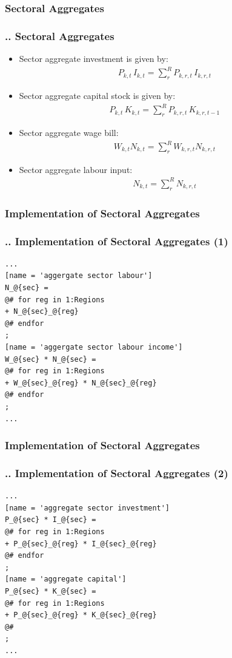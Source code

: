 \documentclass[11pt,aspectratio=169]{beamer}
\begin{document}
\subsubsection{Sectoral Aggregates}
\begin{frame}
\frametitle{{\thesection.\thesubsection.\thesubsubsection} Sectoral Aggregates}
\scriptsize
\begin{itemize}
\item Sector aggregate investment is given by:
\begin{align*}
P_{k,t} \, I_{k,t} = \sum_{r}^{R} P_{k,r,t} \, I_{k,r,t}
\end{align*}
\item Sector aggregate capital stock is given by:
\begin{align*}
P_{k,t} \, K_{k,t} = \sum_{r}^{R} P_{k,r,t} \, K_{k,r,t-1}
\end{align*}
\item Sector aggregate wage bill:
\begin{align*}
W_{k,t} N_{k,t} = \sum_{r}^{R}  W_{k,r,t} N_{k,r,t}
\end{align*}
\item Sector aggregate labour input:
\begin{align*}
N_{k,t} = \sum_{r}^{R} N_{k,r,t}
\end{align*}
\end{itemize}
\end{frame}

\subsubsection{Implementation of Sectoral Aggregates}
\begin{frame}[fragile]
\frametitle{{\thesection.\thesubsection.\thesubsubsection} Implementation of Sectoral Aggregates (1)}

\begin{lstlisting}[frame = single]
...
[name = 'aggergate sector labour']
N_@{sec} = 
@# for reg in 1:Regions
+ N_@{sec}_@{reg}
@# endfor
;
[name = 'aggergate sector labour income']
W_@{sec} * N_@{sec} = 
@# for reg in 1:Regions
+ W_@{sec}_@{reg} * N_@{sec}_@{reg}
@# endfor
;
...
\end{lstlisting}
\end{frame}

\subsubsection{Implementation of Sectoral Aggregates}
\begin{frame}[fragile]
\frametitle{{\thesection.\thesubsection.\thesubsubsection} Implementation of Sectoral Aggregates (2)}

\begin{lstlisting}[frame = single]
...
[name = 'aggregate sector investment']
P_@{sec} * I_@{sec} = 
@# for reg in 1:Regions
+ P_@{sec}_@{reg} * I_@{sec}_@{reg}
@# endfor
;
[name = 'aggregate capital']
P_@{sec} * K_@{sec} = 
@# for reg in 1:Regions
+ P_@{sec}_@{reg} * K_@{sec}_@{reg}
@#
;
...
\end{lstlisting}
\end{frame}
\end{document}
